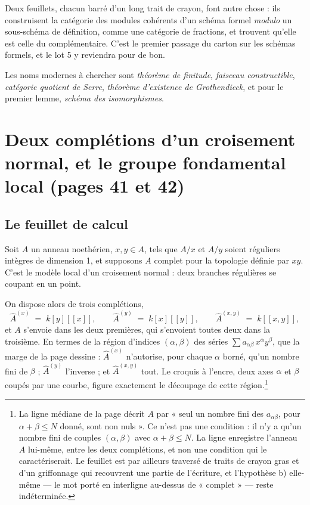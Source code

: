 \documentclass[11pt,a4paper]{article}
\begin{document}
\begin{resume}
Deux feuillets, chacun barré d'un long trait de crayon, font autre chose :
ils construisent la catégorie des modules cohérents d'un schéma formel
\emph{modulo} un sous-schéma de définition, comme une catégorie de fractions,
et trouvent qu'elle est celle du complémentaire. C'est le premier passage du
carton sur les schémas formels, et le lot 5 y reviendra pour de bon.

Les noms modernes à chercher sont \emph{théorème de finitude}, \emph{faisceau
constructible}, \emph{catégorie quotient de Serre}, \emph{théorème d'existence
de Grothendieck}, et pour le premier lemme, \emph{schéma des isomorphismes}.

\end{resume}

\section*{Deux complétions d'un croisement normal, et le groupe fondamental local (pages 41 et 42)}

\subsection*{Le feuillet de calcul}

Soit $A$ un anneau noethérien, $x, y \in A$, tels que $A/x$ et $A/y$ soient
réguliers intègres de dimension 1, et supposons $A$ complet pour la topologie
définie par $xy$. C'est le modèle local d'un croisement normal : deux branches
régulières se coupant en un point.

On dispose alors de trois complétions,
\[
  \hat{A}^{(x)} \;=\; k[y][[x]] , \qquad
  \hat{A}^{(y)} \;=\; k[x][[y]] , \qquad
  \hat{A}^{(x,y)} \;=\; k[[x,y]] ,
\]
et $A$ s'envoie dans les deux premières, qui s'envoient toutes deux dans la
troisième. En termes de la région d'indices $(\alpha, \beta)$ des séries
$\sum a_{\alpha\beta}\, x^{\alpha} y^{\beta}$, que la marge de la page
dessine : $\hat{A}^{(x)}$ n'autorise, pour chaque $\alpha$ borné, qu'un nombre
fini de $\beta$ ; $\hat{A}^{(y)}$ l'inverse ; et $\hat{A}^{(x,y)}$ tout.
Le croquis à l'encre, deux axes $\alpha$ et $\beta$ coupés par une courbe,
figure exactement le découpage de cette région.\footnote{La ligne médiane de la
page décrit $A$ par « seul un nombre fini des $a_{\alpha\beta}$, pour
$\alpha + \beta \leqslant N$ donné, sont non nuls ». Ce n'est pas une
condition : il n'y a qu'un nombre fini de couples $(\alpha,\beta)$ avec
$\alpha+\beta \leqslant N$. La ligne enregistre l'anneau $A$ lui-même, entre
les deux complétions, et non une condition qui le caractériserait. Le feuillet
est par ailleurs traversé de traits de crayon gras et d'un griffonnage qui
recouvrent une partie de l'écriture, et l'hypothèse b) elle-même --- le mot
porté en interligne au-dessus de « complet » --- reste indéterminée.}
\end{document}
